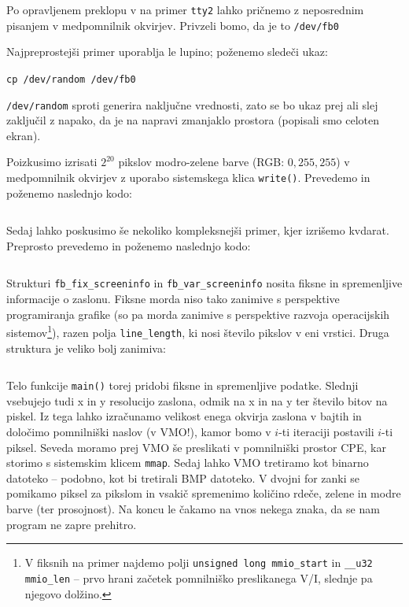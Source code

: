 \documentclass{article}
\begin{document}
Po opravljenem preklopu v na primer \texttt{tty2} lahko pričnemo z neposrednim pisanjem v medpomnilnik okvirjev. Privzeli bomo, da je to \texttt{/dev/fb0}

Najpreprostejši primer uporablja le lupino; poženemo sledeči ukaz: \\

\centerline{\texttt{cp /dev/random /dev/fb0}}

\texttt{/dev/random} sproti generira naključne vrednosti, zato se bo ukaz prej ali slej zaključil z napako, da je na napravi zmanjaklo prostora (popisali smo celoten ekran).

Poizkusimo izrisati $2^{20}$ pikslov modro-zelene barve (RGB: $0, 255, 255$) v medpomnilnik okvirjev z uporabo sistemskega klica \texttt{write()}.
Prevedemo in poženemo naslednjo kodo: \autocite[predelana koda]{displaywithframebuffer}

\inputminted[linenos,breaklines,bgcolor=bg,fontsize=\small]{C}{simple_framebuffer.c}

Sedaj lahko poskusimo še nekoliko kompleksnejši primer, kjer izrišemo kvdarat. Preprosto prevedemo in poženemo naslednjo kodo: \autocite{displaywithframebuffer}

\inputminted[linenos,breaklines,bgcolor=bg,fontsize=\small]{C}{framebuffer_testing.c}

Strukturi \texttt{fb_fix_screeninfo} in \texttt{fb_var_screeninfo} \autocite{fbdevapi} nosita fiksne in spremenljive informacije o zaslonu. Fiksne morda niso tako zanimive s perspektive programiranja grafike (so pa morda zanimive s perspektive razvoja operacijskih sistemov\footnote{V fiksnih na primer najdemo polji \texttt{unsigned long mmio_start} in \texttt{__u32 mmio_len} -- prvo hrani začetek pomnilniško preslikanega V/I, slednje pa njegovo dolžino.}), razen polja \texttt{line_length}, ki nosi število pikslov v eni vrstici. Druga struktura je veliko bolj zanimiva:

\inputminted[linenos,bgcolor=bg,fontsize=\small]{C}{fb_var_screeninfo.h}

Telo funkcije \texttt{main()} torej pridobi fiksne in spremenljive podatke. Slednji vsebujejo tudi x in y resolucijo zaslona, odmik na x in na y ter število bitov na piskel. Iz tega lahko izračunamo velikost enega okvirja zaslona v bajtih in določimo pomnilniški naslov (v VMO!), kamor bomo v $i$-ti iteraciji postavili $i$-ti piksel. Seveda moramo prej VMO še preslikati v pomnilniški prostor CPE, kar storimo s sistemskim klicem \texttt{mmap}.
Sedaj lahko VMO tretiramo kot binarno datoteko -- podobno, kot bi tretirali BMP datoteko. V dvojni for zanki se pomikamo piksel za pikslom in vsakič spremenimo količino rdeče, zelene in modre barve (ter prosojnost). Na koncu le čakamo na vnos nekega znaka, da se nam program ne zapre prehitro.
\end{document}
